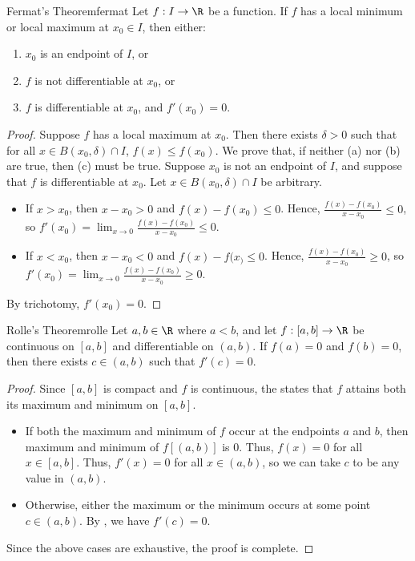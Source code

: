 \begin{thmbox}{Fermat's Theorem}{fermat}
    Let $f : I \to \R$ be a function. If $f$ has a local minimum or local maximum at $x_0 \in I$, then either:
    \begin{enumerate}[label=(\alph*)]
        \item $x_0$ is an endpoint of $I$, or
        \item $f$ is not differentiable at $x_0$, or
        \item $f$ is differentiable at $x_0$, and $f\prime (x_0) = 0$.
    \end{enumerate}
    \tcblower
    \begin{proof}
        Suppose $f$ has a local maximum at $x_0$. Then there exists $\delta > 0$ such that for all $x \in B(x_0, \delta) \cap I$, $f(x) \leq f(x_0)$. We prove that, if neither (a) nor (b) are true, then (c) must be true. Suppose $x_0$ is not an endpoint of $I$, and suppose that $f$ is differentiable at $x_0$. Let $x \in B(x_0, \delta) \cap I$ be arbitrary.
        \begin{itemize}
            \item If $x > x_0$, then $x - x_0 >0$ and $f(x) - f(x_0) \leq 0$. Hence, $\frac{f(x) - f(x_0)}{x - x_0} \leq 0$, so $f\prime(x_0) = \lim_{x \to 0} \frac{f(x) - f(x_0)}{x - x_0} \leq 0$.
            \item If $x < x_0$, then $x - x_0 < 0$ and $f(x) - f(x_) \leq 0$. Hence, $\frac{f(x) - f(x_0)}{x - x_0} \geq 0$, so $f\prime(x_0) = \lim_{x \to 0} \frac{f(x) - f(x_0)}{x - x_0} \geq 0$.
        \end{itemize}
        By trichotomy, $f\prime(x_0) = 0$.
    \end{proof}
\end{thmbox}

\begin{thmbox}{Rolle's Theorem}{rolle}
    Let $a,b \in \R$ where $a < b$, and let $f : [a,b] \to \R$ be continuous on $[a,b]$ and differentiable on $(a,b)$. If $f(a) = 0$ and $f(b) = 0$, then there exists $c \in (a,b)$ such that $f\prime(c) = 0$.
    \tcblower
    \begin{proof}
        Since $[a,b]$ is compact and $f$ is continuous, the  states that $f$ attains both its maximum and minimum on $[a,b]$.
        \begin{itemize}
            \item If both the maximum and minimum of $f$ occur at the endpoints $a$ and $b$, then maximum and minimum of $f[(a,b)]$ is $0$. Thus, $f(x) = 0$ for all $x \in [a,b]$. Thus, $f\prime(x) = 0$ for all $x \in (a,b)$, so we can take $c$ to be any value in $(a,b)$.
            \item Otherwise, either the maximum or the minimum occurs at some point $c \in (a,b)$. By , we have $f\prime(c) = 0$.
        \end{itemize}
        Since the above cases are exhaustive, the proof is complete.
    \end{proof}
\end{thmbox}

